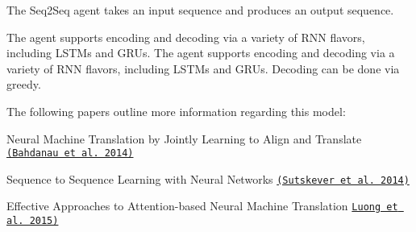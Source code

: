 The Seq2\+Seq agent takes an input sequence and produces an output sequence.

The agent supports encoding and decoding via a variety of R\+NN flavors, including L\+S\+T\+Ms and G\+R\+Us. The agent supports encoding and decoding via a variety of R\+NN flavors, including L\+S\+T\+Ms and G\+R\+Us. Decoding can be done via greedy.

The following papers outline more information regarding this model\+:
\begin{DoxyItemize}
\item Neural Machine Translation by Jointly Learning to Align and Translate \href{arxiv.org/abs/1409.0473}{\tt (Bahdanau et al. 2014)}
\item Sequence to Sequence Learning with Neural Networks \href{arxiv.org/abs/1409.3215}{\tt (Sutskever et al. 2014)}
\item Effective Approaches to Attention-\/based Neural Machine Translation \href{arxiv.org/abs/1508.04025}{\tt Luong et al. 2015)} 
\end{DoxyItemize}